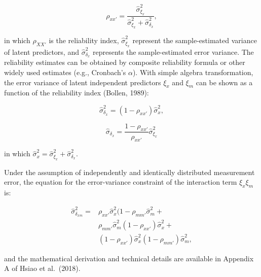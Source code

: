 \documentclass[
  man]{apa7}
\begin{document}
\begin{equation}
\rho_{xx'} = \frac{\hat{\sigma}^2_{\xi_{x}}}{\hat{\sigma}^2_{\xi_{x}} + \hat{\sigma}^2_{\delta_{x}}},
\end{equation}

in which \(\rho_{XX'}\) is the reliability index, \(\hat{\sigma}^2_{\xi_{x}}\) represent the sample-estimated variance of latent predictors, and \(\hat{\sigma}^2_{\delta_{x}}\) represents the sample-estimated error variance. The reliability estimates can be obtained by composite reliability formula or other widely used estimates (e.g., Cronbach's \(\alpha\)). With simple algebra transformation, the error variance of latent independent predictors \(\xi_{x}\) and \(\xi_{m}\) can be shown as a function of the reliability index (Bollen, 1989):

\begin{equation}
\hat{\sigma}^2_{\delta_{x}} = (1 - \rho_{xx'})\hat{\sigma}^2_{{x}},
\end{equation}

\begin{equation}
\hat{\sigma}_{\delta_{x}} = \frac{1 - \rho_{xx'}}{\rho_{xx'}}\hat{\sigma}^2_{{\xi_{x}}}
\end{equation}

in which \(\hat{\sigma}^2_{{x}} = {\hat{\sigma}^2_{\xi_{x}} + \hat{\sigma}^2_{\delta_{x}}}\).

Under the assumption of independently and identically distributed measurement error, the equation for the error-variance constraint of the interaction term \(\xi_{x}\xi_{m}\) is:

\begin{equation}
\begin{aligned}
\hat{\sigma}^2_{\delta_{xm}} = & \rho_{xx'}\hat{\sigma}^2_{{x}}(1 - \rho_{mm'}\hat{\sigma}^2_{{m}} + \\&
                        \rho_{mm'}\hat{\sigma}^2_{{m}}(1-\rho_{xx'})\hat{\sigma}^2_{{x}} + \\&
                        (1 - \rho_{xx'})\hat{\sigma}^2_{{x}}(1 - \rho_{mm'})\hat{\sigma}^2_{{m}}, 
\end{aligned}
\end{equation}

and the mathematical derivation and technical details are available in Appendix A of Hsiao et al.~(2018).
\end{document}
